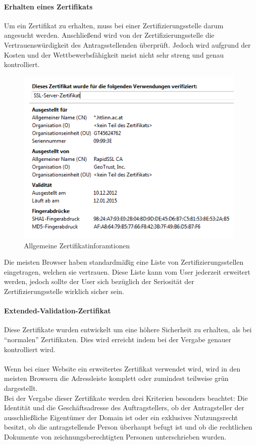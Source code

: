 \paragraph{Erhalten eines Zertifikats}
Um ein Zertifikat zu erhalten, muss bei einer Zertifizierungsstelle darum angesucht werden. Anschließend wird von der Zertifizierungsstelle die Vertrauenswürdigkeit des Antragsstellenden überprüft. Jedoch wird aufgrund der Kosten und der Wettbewerbsfähigkeit meist nicht sehr streng und genau kontrolliert.
\begin{figure}[H]
\centering
\includegraphics[keepaspectratio=true, width=12cm]{images/screenshots/certificate.png}
\caption{Allgemeine Zertifikatinforamtionen}
\label{fig:certificate}
\end{figure}
Die meisten Browser haben standardmäßig eine Liste von Zertifizierungsstellen eingetragen, welchen sie vertrauen. Diese Liste kann vom User jederzeit erweitert werden, jedoch sollte der User sich bezüglich der Seriosität der Zertifizierungsstelle wirklich sicher sein. 
\paragraph{Extended-Validation-Zertifikat}
Diese Zertifikate wurden entwickelt um eine höhere Sicherheit zu erhalten, als bei \enquote{normalen} Zertifikaten. Dies wird erreicht indem bei der Vergabe genauer kontrolliert wird. \\\\
Wenn bei einer Website ein erweitertes Zertifikat verwendet wird, wird in den meisten Browsern die Adressleiste komplett oder zumindest teilweise grün dargestellt.
\\
Bei der Vergabe dieser Zertifikate werden drei Kriterien besonders beachtet:
Die Identität und die Geschäftsadresse des Auftragstellers, ob der Antragsteller der ausschließliche Eigentümer der Domain ist oder ein exklusives Nutzungsrecht besitzt, ob die antragstellende Person überhaupt befugt ist und ob die rechtlichen Dokumente von zeichnungsberechtigten Personen unterschrieben wurden.

